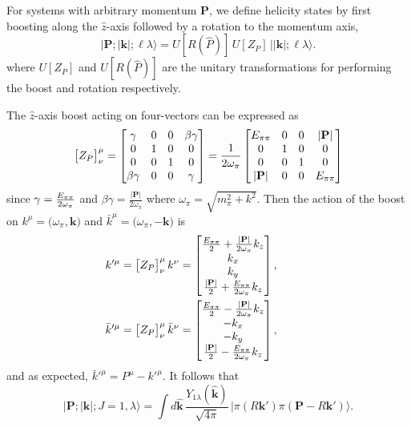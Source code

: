 For systems with arbitrary momentum $\textbf{P}$, we define helicity states by first boosting along the $\hat{z}$-axis followed by a rotation to the momentum axis,
\begin{equation}
\big| \textbf{P}; |\textbf{k}|; \ell \lambda \big\rangle = U[R(\hat{P})]\, U[Z_P]\,  \big| |\textbf{k}|; \ell \lambda \big\rangle.
\end{equation}
where $U[Z_P]$ and $U[R(\hat{P})]$ are the unitary transformations for performing the boost and rotation respectively. 

The $\hat{z}$-axis boost acting on four-vectors can be expressed as
\begin{equation}
	\big[ Z_P \big]^\mu_\nu = 
		\begin{bmatrix} 
			\gamma & 0 & 0 & \beta \gamma \\
			0 & 1 & 0 & 0 \\
			0 & 0 & 1 & 0 \\
			\beta \gamma & 0 & 0 & \gamma	
		\end{bmatrix}
		= \frac{1}{2 \omega_\pi}
		\begin{bmatrix} 
			E_{\pi\pi} & 0 & 0 & |\textbf{P}|\\
			0 & 1 & 0 & 0 \\
			0 & 0 & 1 & 0 \\
			|\textbf{P}| & 0 & 0 & E_{\pi\pi}	
		\end{bmatrix}
\end{equation}
since $\gamma = \frac{E_{\pi\pi}}{2\omega_\pi}$ and $\beta \gamma = \frac{|\textbf{P}|}{2 \omega_\pi}$ where $\omega_\pi = \sqrt{m_\pi^2 + k^2}$. Then the action of the boost on $k^\mu = \big(\omega_\pi, \textbf{k}\big)$ and ${\bar{k}^\mu = \big(\omega_\pi , -\textbf{k} \big)}$ is
\begin{align}
k'^\mu &= \big[ Z_P \big]^\mu_\nu \, k^\nu = 
	\begin{bmatrix} \tfrac{E_{\pi\pi}}{2} + \tfrac{|\textbf{P}|}{2\omega_\pi} k_z \\ k_x \\ k_y \\ \tfrac{|\textbf{P}|}{2} + \tfrac{E_{\pi\pi}}{2\omega_\pi} k_z \end{bmatrix},
	\quad \quad\quad\nonumber\\
\bar{k}'^\mu &= \big[ Z_P \big]^\mu_\nu \, \bar{k}^\nu = 
	\begin{bmatrix} \tfrac{E_{\pi\pi}}{2} - \tfrac{|\textbf{P}|}{2\omega_\pi} k_z \\ -k_x \\ -k_y \\ \tfrac{|\textbf{P}|}{2} - \tfrac{E_{\pi\pi}}{2\omega_\pi} k_z \end{bmatrix},	
\end{align}
and as expected, $\bar{k}'^\mu = P^\mu - k'^\mu$. It follows that 
\begin{equation}
\big| \textbf{P}; |\textbf{k}|; J=1, \lambda \big\rangle = \int \! d\hat{\mathbf{k}} \, \frac{Y_{1\lambda}(\hat{\mathbf{k}})}{\sqrt{4\pi}}\, \big| \pi(R\textbf{k}') \pi( \textbf{P} - R\textbf{k}') \big\rangle.
\end{equation}


